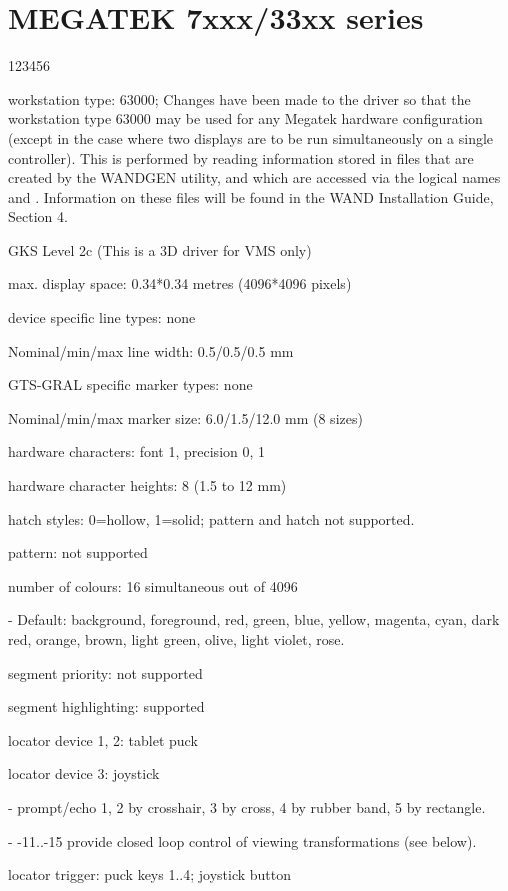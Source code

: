\section{MEGATEK 7xxx/33xx series}
\begin{DLtt}{123456}
\item[workstation type:]63000; Changes have been made to the
driver so that the workstation type 63000 may be used for any Megatek
hardware configuration (except in the case where two displays are to
be run simultaneously on a single controller). This is performed by
reading information stored in files that are created by the WANDGEN
utility, and which are accessed via the logical names 
and . Information on these files will be found in the
WAND Installation Guide, Section 4.
\item[GKS Level]2c  (This is a 3D driver for VMS only)
\item[max. display space:]0.34*0.34 metres (4096*4096 pixels)
\item[device specific line types:]none
\item[Nominal/min/max line width:]0.5/0.5/0.5 mm
\item[GTS-GRAL specific marker types:]none
\item[Nominal/min/max marker size:]6.0/1.5/12.0 mm (8 sizes)
\item[hardware characters:]font 1, precision 0, 1
\item[hardware character heights:]8 (1.5 to 12 mm)
\item[hatch styles:]0=hollow, 1=solid; pattern and hatch not supported.
\item[pattern:]not supported
\item[number of colours:]16 simultaneous out of 4096
\item[-]Default: background, foreground, red, green, blue, yellow, magenta,
cyan, dark red, orange, brown, light green, olive, light violet, rose.
\item[segment priority:]not supported
\item[segment highlighting:]supported
\item[locator device 1, 2:]tablet puck
\item[locator device 3:]joystick
\item[-]prompt/echo 1, 2 by crosshair, 3 by cross, 4 by rubber band,
5 by rectangle.
\item[-]-11..-15 provide closed loop control of viewing transformations
(see below).
\item[locator trigger:]puck keys 1..4; joystick button

\end{DLtt}
